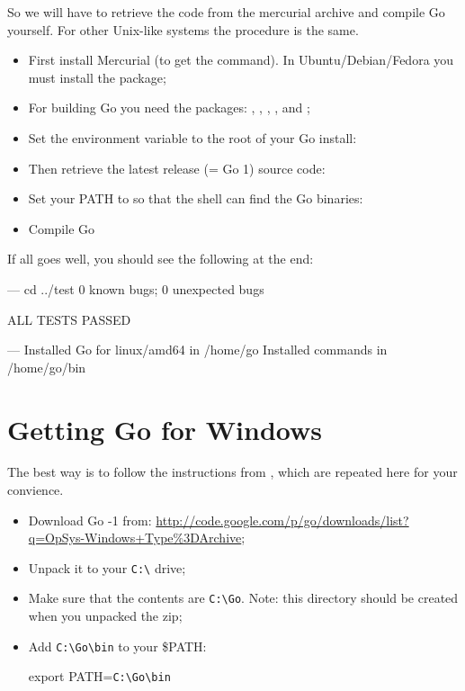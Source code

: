 So we will have to retrieve the code from the mercurial archive and compile
Go yourself. For other Unix-like systems the procedure is the same.
\begin{itemize}
\item First install Mercurial (to get the  command). In
Ubuntu/Debian/Fedora you must install the  package;

\item For building Go you need the packages: ,
, , ,  and ;

\item Set the environment variable  to the root of your
Go install:
\begin{display}
\pr {}
\end{display}

\item Then retrieve the latest release (= Go 1) source code:
\begin{display}
\pr {}
\end{display}

\item Set your PATH to so that the shell can find the Go binaries:
\begin{display}
\pr {}
\end{display}
\item Compile Go
\begin{display}
\pr {}
\pr {}
\end{display}
\end{itemize}
If all goes well, you should see the following at the end:
\begin{display}
--- cd ../test
0 known bugs; 0 unexpected bugs

ALL TESTS PASSED

---
Installed Go for linux/amd64 in /home/go
Installed commands in /home/go/bin
\end{display}

\section{Getting Go for Windows}
The best way is to follow the instructions from \cite{go_install}, which are repeated
here for your convience.

\begin{itemize}
\item Download Go -1 from:
\url{http://code.google.com/p/go/downloads/list?q=OpSys-Windows+Type%3DArchive};
\item Unpack it to your \verb|C:\| drive;
\item Make sure that the contents are \verb|C:\Go|. Note: this directory should be
created when you unpacked the zip;
\item Add \verb|C:\Go\bin| to your \$PATH:
\begin{display}
export PATH=\verb|C:\Go\bin|
\end{display}
\end{itemize}


